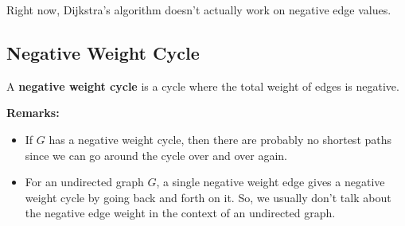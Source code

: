 \documentclass[letterpaper]{article}
\begin{document}
\bigskip 

Right now, Dijkstra's algorithm doesn't actually work on negative edge values. 

\subsection{Negative Weight Cycle}
\begin{definition}{}{}
    A \textbf{negative weight cycle} is a cycle where the total weight of edges is negative. 
\end{definition}
\textbf{Remarks:}
\begin{itemize}
    \item If $G$ has a negative weight cycle, then there are probably no shortest paths since we can go around the cycle over and over again. 
    \item For an undirected graph $G$, a single negative weight edge gives a negative weight cycle by going back and forth on it. So, we usually don't talk about the negative edge weight in the context of an undirected graph. 
\end{itemize}
\end{document}
